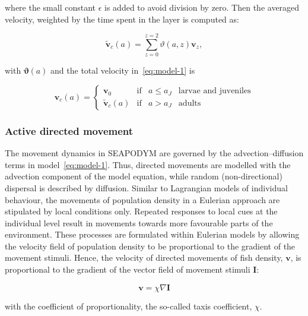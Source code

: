 \noindent where the small constant $\epsilon$ is added to avoid division by zero. Then the averaged velocity, weighted by the time spent in the layer is computed as:

\begin{equation}
    \label{eq:mean-currents}
      \tilde{\mathbf{v}}_c(a) = \sum_{z=0}^{z=2}\vartheta(a,z) \mathbf{v}_z,
 \end{equation}
 
\noindent with $\mathbf{\vartheta}(a)$ and the total velocity in~\eqref{eq:model-1} is

\begin{equation}
  \label{eq:mean-currents-ages}
  \mathbf{v}_c(a) =\left\lbrace
  \begin{array}{llll}
    \mathbf{v}_0   &\mbox{if}& a\leq a_J & \mbox{larvae and juveniles}\\
    \tilde{\mathbf{v}}_c(a) &\mbox{if}& a>a_J & \mbox{adults}
  \end{array}
  \right.
\end{equation}


\subsubsection{Active directed movement}\label{sec:movement}
The movement dynamics in SEAPODYM are governed by the advection--diffusion terms in model~\eqref{eq:model-1}. Thus, directed movements are modelled with the advection component of the model equation, while random (non-directional) dispersal is described by diffusion. Similar to Lagrangian models of individual behaviour, the movements of population density in a Eulerian approach are stipulated by local conditions only. Repeated responses to local cues at the individual level result in movements towards more favourable parts of the environment. These processes are formulated within Eulerian models by allowing the velocity field of population density to be proportional to the gradient of the movement stimuli. Hence, the velocity of directed movements of fish density, $\mathbf{v}$, is proportional to the gradient of the vector field of movement stimuli $\mathbf{I}$: 

\begin{equation}
\label{eq:density-velocity}
\mathbf{v}=\chi \nabla \mathbf{I}
\end{equation}

\noindent with the coefficient of proportionality, the so-called taxis coefficient, $\chi$.  

